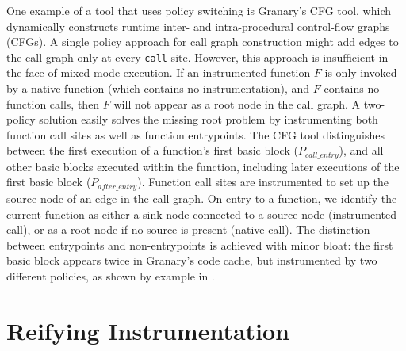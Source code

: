 \documentclass[preprint]{sigplanconf}
\begin{document}
One example of a tool that uses policy switching is Granary's CFG tool, which dynamically constructs runtime inter- and intra-procedural control-flow graphs (CFGs). A single policy approach for call graph construction might add edges to the call graph only at every \texttt{call} site. However, this approach is insufficient in the face of mixed-mode execution. If an instrumented function $F$ is only invoked by a native function (which contains no instrumentation), and $F$ contains no function calls, then $F$ will not appear as a root node in the call graph. A two-policy solution easily solves the missing root problem by instrumenting both function call sites as well as function entrypoints. The CFG tool distinguishes between the first execution of a function's first basic block ($P_{call\_entry}$), and all other basic blocks executed within the function, including later executions of the first basic block ($P_{after\_entry}$). Function call sites are instrumented to set up the source node of an edge in the call graph. On entry to a function, we identify the current function as either a sink node connected to a source node (instrumented call), or as a root node if no source is present (native call). The distinction between entrypoints and non-entrypoints is achieved with minor bloat: the first basic block appears twice in Granary's code cache, but instrumented by two different policies, as shown by example in .




\section{Reifying Instrumentation}\label{sec:reify}
\end{document}
